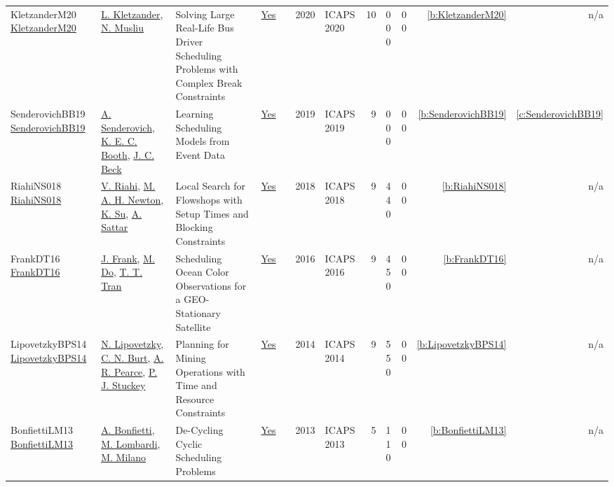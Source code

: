 {\begin{longtable}{>{\raggedright\arraybackslash}p{3cm}>{\raggedright\arraybackslash}p{4.5cm}>{\raggedright\arraybackslash}p{6.0cm}rrrp{2.5cm}rp{1cm}p{1cm}rr}
KletzanderM20 \href{https://ojs.aaai.org/index.php/ICAPS/article/view/6688}{KletzanderM20} & \hyperref[auth:a78]{L. Kletzander}, \hyperref[auth:a45]{N. Musliu} & Solving Large Real-Life Bus Driver Scheduling Problems with Complex Break Constraints & \href{../works/KletzanderM20.pdf}{Yes} & \cite{KletzanderM20} & 2020 & ICAPS 2020 & 10 & 0 0 0 & 0 0 & \ref{b:KletzanderM20} & n/a\\
SenderovichBB19 \href{https://ojs.aaai.org/index.php/ICAPS/article/view/3504}{SenderovichBB19} & \hyperref[auth:a1372]{A. Senderovich}, \hyperref[auth:a203]{K. E. C. Booth}, \hyperref[auth:a89]{J. C. Beck} & Learning Scheduling Models from Event Data & \href{../works/SenderovichBB19.pdf}{Yes} & \cite{SenderovichBB19} & 2019 & ICAPS 2019 & 9 & 0 0 0 & 0 0 & \ref{b:SenderovichBB19} & \ref{c:SenderovichBB19}\\
RiahiNS018 \href{https://aaai.org/ocs/index.php/ICAPS/ICAPS18/paper/view/17755}{RiahiNS018} & \hyperref[auth:a388]{V. Riahi}, \hyperref[auth:a389]{M. A. H. Newton}, \hyperref[auth:a390]{K. Su}, \hyperref[auth:a391]{A. Sattar} & Local Search for Flowshops with Setup Times and Blocking Constraints & \href{../works/RiahiNS018.pdf}{Yes} & \cite{RiahiNS018} & 2018 & ICAPS 2018 & 9 & 4 4 0 & 0 0 & \ref{b:RiahiNS018} & n/a\\
FrankDT16 \href{http://www.aaai.org/ocs/index.php/ICAPS/ICAPS16/paper/view/13072}{FrankDT16} & \hyperref[auth:a379]{J. Frank}, \hyperref[auth:a809]{M. Do}, \hyperref[auth:a799]{T. T. Tran} & Scheduling Ocean Color Observations for a GEO-Stationary Satellite & \href{../works/FrankDT16.pdf}{Yes} & \cite{FrankDT16} & 2016 & ICAPS 2016 & 9 & 4 5 0 & 0 0 & \ref{b:FrankDT16} & n/a\\
LipovetzkyBPS14 \href{http://www.aaai.org/ocs/index.php/ICAPS/ICAPS14/paper/view/7942}{LipovetzkyBPS14} & \hyperref[auth:a323]{N. Lipovetzky}, \hyperref[auth:a322]{C. N. Burt}, \hyperref[auth:a324]{A. R. Pearce}, \hyperref[auth:a125]{P. J. Stuckey} & Planning for Mining Operations with Time and Resource Constraints & \href{../works/LipovetzkyBPS14.pdf}{Yes} & \cite{LipovetzkyBPS14} & 2014 & ICAPS 2014 & 9 & 5 5 0 & 0 0 & \ref{b:LipovetzkyBPS14} & n/a\\
BonfiettiLM13 \href{http://www.aaai.org/ocs/index.php/ICAPS/ICAPS13/paper/view/6050}{BonfiettiLM13} & \hyperref[auth:a198]{A. Bonfietti}, \hyperref[auth:a142]{M. Lombardi}, \hyperref[auth:a143]{M. Milano} & De-Cycling Cyclic Scheduling Problems & \href{../works/BonfiettiLM13.pdf}{Yes} & \cite{BonfiettiLM13} & 2013 & ICAPS 2013 & 5 & 1 1 0 & 0 0 & \ref{b:BonfiettiLM13} & n/a\\

\end{longtable}}
